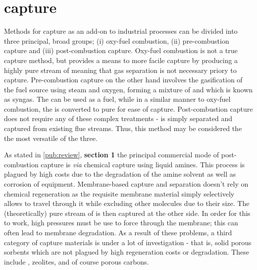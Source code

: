 \section{\texorpdfstring{ capture}{CO2 capture}}
\label{s:ccs}

Methods for  capture as an add-on to industrial processes can be divided into three principal, broad groups; (i) oxy-fuel combustion, (ii) pre-combustion capture and (iii) post-combustion capture.\citep{kanniche2010pre} Oxy-fuel combustion is not a true  capture method, but provides a means to more facile  capture by producing a highly pure stream of  meaning that gas separation is not necessary priory to capture.\citep{stanger2015oxyfuel, wall2009overview} Pre-combustion capture on the other hand involves the gasification of the fuel source using steam and oxygen, forming a mixture of  and  which is known as syngas. The  can be used as a fuel, while in a similar manner to oxy-fuel combustion, the  is converted to pure  for ease of capture.\citep{jansen2015pre} Post-combustion capture does not require any of these complex treatments -  is simply separated and captured from existing flue streams.\citep{wang2017review, samanta2012post} Thus, this method may be considered the the most versatile of the three.

As stated in \ref{pub:review}, \textbf{section 1} the principal commercial mode of post-combustion  capture is \textit{via} chemical capture using liquid amines. This process is plagued by high costs due to the degradation of the amine solvent as well as corrosion of equipment.\citep{aronu2009solvent, dutcher2015amine, delgado2018degradation} Membrane-based  capture and separation doesn't rely on chemical regeneration as the requisite membrane material simply selectively allows  to travel through it while excluding other molecules due to their size.\citep{adewole2013current, ramasubramanian2011recent} The (theoretically) pure stream of  is then captured at the other side. In order for this to work, high pressures must be use to force  through the membrane; this can often lead to membrane degradation.\citep{powell2006polymeric} As a result of these problems, a third category of  capture materials is under a lot of investigation - that is, solid porous sorbents which are not plagued by high regeneration costs or degradation. These include ,\citep{Ding2019Carbon, qian2020mof} zeolites,\citep{Siriwardane2005Adsorption, Krishna2010silico} and of course porous carbons.\citep{Zhu2015Naturally, Chen2019Template, Xia2011Superior, Sevilla2016Highly} 

